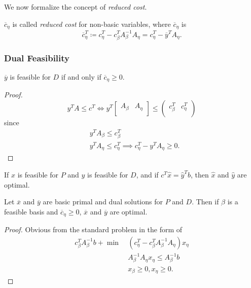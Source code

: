 We now formalize the concept of \emph{reduced cost}.
\begin{definition}
	\(\overline{c}_{\eta}\) is called \emph{reduced cost} for non-basic variables, where \(\overline{c}_{\eta}\) is
	\[
		\overline{c}_{\eta}^{T} \coloneqq c_{\eta}^{T} - c_{\beta}^{T} A^{-1}_{\beta}A_{\eta} = c_{\eta}^{T} - \overline{y}^{T}A_{\eta}.
	\]
\end{definition}

\subsubsection{Dual Feasibility}
\begin{lemma}
	\(\overline{y}\) is feasible for \(D\) if and only if \(\overline{c}_{\eta}\geq 0\).
\end{lemma}
\begin{proof}
	\[
		y^{T}A\leq c^{T} \iff y^{T}\begin{bmatrix}
			A_{\beta} & A_{\eta} \\
		\end{bmatrix}\leq \begin{pmatrix}
			c_{\beta}^{T} & c_{\eta}^{T} \\
		\end{pmatrix}
	\]
	since
	\[
		\begin{alignedat}{3}
			&y^{T} A_{\beta}\leq c_{\beta}^{T}\\
			&y^{T} A_{\eta}\leq c_{\eta}^{T} \implies c_{\eta}^{T} - y^{T}A_{\eta}\geq 0.
		\end{alignedat}
	\]
\end{proof}

\begin{corollary}
	If \(\hat{x}\) is feasible for \(P\) and \(\hat{y}\) is feasible for \(D\), and if \(c^{T}\hat{x} = \hat{y}^{T} b\), then \(\hat{x}\) and \(\hat{y}\) are optimal.
\end{corollary}

\begin{theorem}
	Let \(\overline{x}\) and \(\overline{y}\) are basic primal and dual solutions for \(P\) and \(D\). Then if \(\beta\) is a feasible basis and \(\overline{c}_{\eta}\geq 0\), \(\overline{x}\) and
	\(\overline{y}\) are optimal.
\end{theorem}
\begin{proof}
	Obvious from the standard problem in the form of
	\begin{align*}
		c^{T}_{\beta}A^{-1}_{\beta}b + \min~ & (c_{\eta}^{T} - c_{\beta}^{T}A^{-1}_{\beta}A_{\eta})x_{\eta} \\
		                                     & A^{-1}_{\beta}A_{\eta}x_{\eta} \leq A^{-1}_{\beta}b          \\
		                                     & x_{\beta}\geq 0, x_{\eta}\geq 0.
	\end{align*}
\end{proof}

